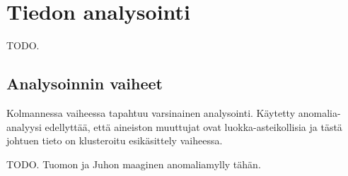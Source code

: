 
\chapter{Tiedon analysointi}


TODO.

\section{Analysoinnin vaiheet}

Kolmannessa vaiheessa tapahtuu varsinainen analysointi. Käytetty
anomalia-a\-na\-lyy\-si edellyttää, että aineiston muuttujat ovat
luokka-asteikollisia ja tästä johtuen tieto on klusteroitu esikäsittely vaiheessa.

TODO. Tuomon ja Juhon maaginen anomaliamylly tähän.
